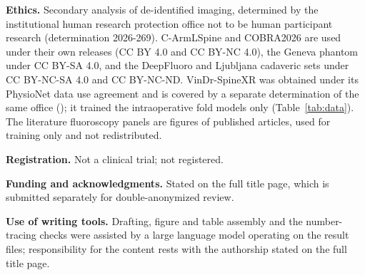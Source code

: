 \textbf{Ethics.} Secondary analysis of de-identified imaging, determined by the institutional human research protection office not to be human participant research (determination 2026-269). C-ArmLSpine and COBRA2026 are used under their own releases (CC BY 4.0 and CC BY-NC 4.0), the Geneva phantom under CC BY-SA 4.0, and the DeepFluoro and Ljubljana cadaveric sets under CC BY-NC-SA 4.0 and CC BY-NC-ND. VinDr-SpineXR was obtained under its PhysioNet data use agreement and is covered by a separate determination of the same office (); it trained the intraoperative fold models only (Table~\ref{tab:data}). The literature fluoroscopy panels are figures of published articles, used for training only and not redistributed.

\textbf{Registration.} Not a clinical trial; not registered.

\textbf{Funding and acknowledgments.} Stated on the full title page, which is submitted separately for double-anonymized review.


\textbf{Use of writing tools.} Drafting, figure and table assembly and the number-tracing checks were assisted by a large language model operating on the result files; responsibility for the content rests with the authorship stated on the full title page.

\rsnabibliography

